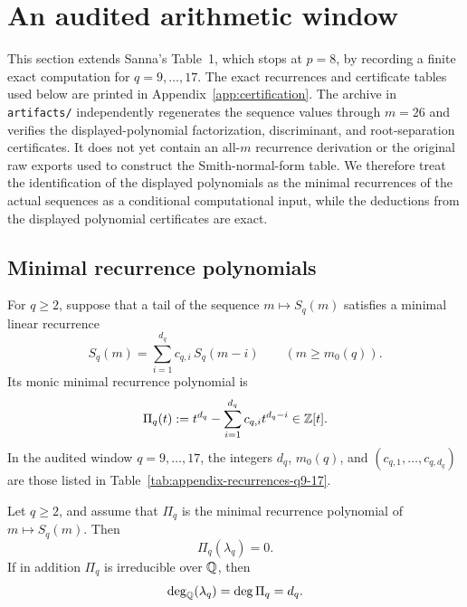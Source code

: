\section{An audited arithmetic window}
\label{sec:chebotarev}

This section extends Sanna's Table~1, which stops at \(p=8\), by recording a
finite exact computation for \(q=9,\dots,17\).  The exact recurrences and
certificate tables used below are printed in Appendix~\ref{app:certification}.
The archive in
\texttt{artifacts/} independently regenerates the sequence values through
\(m=26\) and verifies the displayed-polynomial factorization, discriminant,
and root-separation certificates.  It does not yet contain an all-\(m\)
recurrence derivation or the original raw exports used to construct the
Smith-normal-form table.  We therefore treat the identification of the
displayed polynomials as the minimal recurrences of the actual sequences as a
conditional computational input, while the deductions from the displayed
polynomial certificates are exact.

\subsection{Minimal recurrence polynomials}

\begin{definition}
\label{def:recurrence-polynomials}
For \(q\ge 2\), suppose that a tail of the sequence \(m\mapsto S_q(m)\)
satisfies a minimal linear recurrence
\[
  S_q(m)=\sum_{i=1}^{d_q} c_{q,i}\,S_q(m-i)
  \qquad (m\ge m_0(q)).
\]
Its monic minimal recurrence polynomial is
\[
  \Pi_q(t):=t^{d_q}-\sum_{i=1}^{d_q} c_{q,i} t^{d_q-i}\in\mathbb{Z}[t].
\]
In the audited window \(q=9,\dots,17\), the integers \(d_q\), \(m_0(q)\), and
\((c_{q,1},\dots,c_{q,d_q})\) are those listed in
Table~\ref{tab:appendix-recurrences-q9-17}.
\end{definition}

\begin{proposition}
\label{prop:lambda-root-of-recurrence}
Let \(q\ge 2\), and assume that \(\Pi_q\) is the minimal recurrence polynomial
of \(m\mapsto S_q(m)\).  Then
\[
  \Pi_q(\lambda_q)=0.
\]
If in addition \(\Pi_q\) is irreducible over \(\mathbb{Q}\), then
\[
  \deg_{\mathbb{Q}}(\lambda_q)=\deg \Pi_q=d_q.
\]
\end{proposition}

